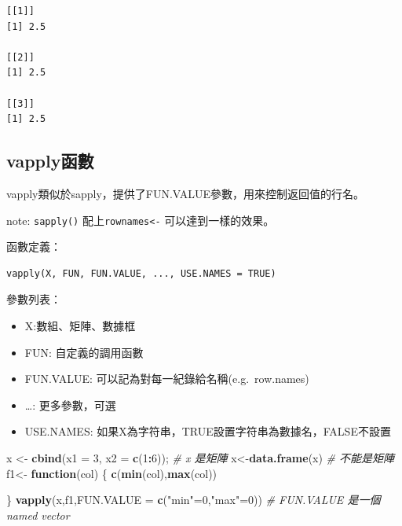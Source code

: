 \documentclass[]{book}
\newenvironment{Shaded}{\begin{snugshade}}{\end{snugshade}}
\newcommand{\CommentTok}[1]{\textcolor[rgb]{0.56,0.35,0.01}{\textit{#1}}}
\newcommand{\ControlFlowTok}[1]{\textcolor[rgb]{0.13,0.29,0.53}{\textbf{#1}}}
\newcommand{\DataTypeTok}[1]{\textcolor[rgb]{0.13,0.29,0.53}{#1}}
\newcommand{\DecValTok}[1]{\textcolor[rgb]{0.00,0.00,0.81}{#1}}
\newcommand{\KeywordTok}[1]{\textcolor[rgb]{0.13,0.29,0.53}{\textbf{#1}}}
\newcommand{\NormalTok}[1]{#1}
\newcommand{\OperatorTok}[1]{\textcolor[rgb]{0.81,0.36,0.00}{\textbf{#1}}}
\newcommand{\StringTok}[1]{\textcolor[rgb]{0.31,0.60,0.02}{#1}}
\providecommand{\tightlist}{%
  \setlength{\itemsep}{0pt}\setlength{\parskip}{0pt}}
\theoremstyle{definition}
\theoremstyle{definition}
\theoremstyle{definition}
\theoremstyle{remark}
\begin{document}
\begin{verbatim}
[[1]]
[1] 2.5

[[2]]
[1] 2.5

[[3]]
[1] 2.5
\end{verbatim}

\hypertarget{vapply}{%
\subsection{vapply函數}\label{vapply}}

vapply類似於sapply，提供了FUN.VALUE參數，用來控制返回值的行名。

note: \texttt{sapply()} 配上\texttt{rownames\textless{}-}
可以達到一樣的效果。

函數定義：

\begin{verbatim}
vapply(X, FUN, FUN.VALUE, ..., USE.NAMES = TRUE)
\end{verbatim}

參數列表：

\begin{itemize}
\tightlist
\item
  X:數組、矩陣、數據框
\item
  FUN: 自定義的調用函數
\item
  FUN.VALUE: 可以記為對每一紀錄給名稱(e.g.~row.names)
\item
  \ldots{}: 更多參數，可選
\item
  USE.NAMES: 如果X為字符串，TRUE設置字符串為數據名，FALSE不設置
\end{itemize}

\begin{Shaded}
\begin{Highlighting}[]
\NormalTok{x <-}\StringTok{ }\KeywordTok{cbind}\NormalTok{(}\DataTypeTok{x1 =} \DecValTok{3}\NormalTok{, }\DataTypeTok{x2 =} \KeywordTok{c}\NormalTok{(}\DecValTok{1}\OperatorTok{:}\DecValTok{6}\NormalTok{)); }\CommentTok{# x 是矩陣}
\NormalTok{x<-}\KeywordTok{data.frame}\NormalTok{(x) }\CommentTok{# 不能是矩陣}
\NormalTok{f1<-}\StringTok{ }\ControlFlowTok{function}\NormalTok{(col) \{}
   \KeywordTok{c}\NormalTok{(}\KeywordTok{min}\NormalTok{(col),}\KeywordTok{max}\NormalTok{(col)) }
  
\NormalTok{\}}
\KeywordTok{vapply}\NormalTok{(x,f1,}\DataTypeTok{FUN.VALUE =} \KeywordTok{c}\NormalTok{(}\StringTok{"min"}\NormalTok{=}\DecValTok{0}\NormalTok{,}\StringTok{"max"}\NormalTok{=}\DecValTok{0}\NormalTok{)) }\CommentTok{# FUN.VALUE 是一個named vector}
\end{Highlighting}
\end{Shaded}
\end{document}

